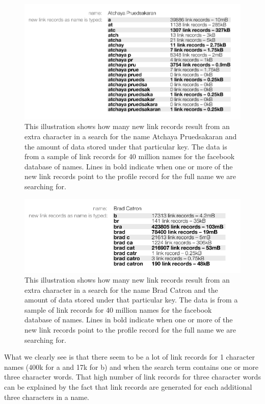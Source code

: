 \begin{figure}[!htb]
\begin{center}
	\includegraphics[width=0.8\linewidth]{illustrations/LinkRecordLookups.png}
\caption{This illustration shows how many new link records result from an extra character in a search for the name Atchaya Pruedsakaran and the amount of data stored under that particular key. The data is from a sample of link records for 40 million names for the facebook database of names. Lines in bold indicate when one or more of the new link records point to the profile record for the full name we are searching for.}
\label{figKeyLookup1}
\end{center}
\end{figure}

\begin{figure}[!htb]
\begin{center}
	\includegraphics[width=0.8\linewidth]{illustrations/LinkRecordLookups2.png}
\caption{This illustration shows how many new link records result from an extra character in a search for the name Brad Catron and the amount of data stored under that particular key. The data is from a sample of link records for 40 million names for the facebook database of names. Lines in bold indicate when one or more of the new link records point to the profile record for the full name we are searching for.}
\label{figKeyLookup2}
\end{center}
\end{figure}

What we clearly see is that there seem to be a lot of link records for 1 character names (400k for a and 17k for b) and when the search term contains one or more three character words. That high number of link records for three character words can be explained by the fact that link records are generated for each additional three characters in a name.

